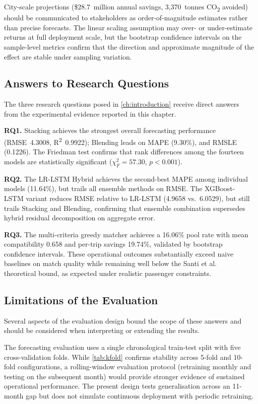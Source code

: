 City-scale projections (\$28.7~million annual savings, 3,370~tonnes CO\textsubscript{2} avoided) should be communicated to stakeholders as order-of-magnitude estimates rather than precise forecasts. The linear scaling assumption may over- or under-estimate returns at full deployment scale, but the bootstrap confidence intervals on the sample-level metrics confirm that the direction and approximate magnitude of the effect are stable under sampling variation.

\subsection{Answers to Research Questions}

The three research questions posed in \autoref{ch:introduction} receive direct answers from the experimental evidence reported in this chapter.

\textbf{RQ1.} Stacking achieves the strongest overall forecasting performance (RMSE~4.3008, R\textsuperscript{2}~0.9922); Blending leads on MAPE (9.30\%), and RMSLE (0.1226). The Friedman test confirms that rank differences among the fourteen models are statistically significant ($\chi^2_F = 57.30$, $p < 0.001$).

\textbf{RQ2.} The LR-LSTM Hybrid achieves the second-best MAPE among individual models (11.64\%), but trails all ensemble methods on RMSE. The XGBoost-LSTM variant reduces RMSE relative to LR-LSTM (4.9658 vs.\ 6.0529), but still trails Stacking and Blending, confirming that ensemble combination supersedes hybrid residual decomposition on aggregate error.

\textbf{RQ3.} The multi-criteria greedy matcher achieves a 16.06\% pool rate with mean compatibility 0.658 and per-trip savings 19.74\%, validated by bootstrap confidence intervals. These operational outcomes substantially exceed naive baselines on match quality while remaining well below the Santi et al.~\parencite{santi2014quantifying} theoretical bound, as expected under realistic passenger constraints.

\subsection{Limitations of the Evaluation}

Several aspects of the evaluation design bound the scope of these answers and should be considered when interpreting or extending the results.

The forecasting evaluation uses a single chronological train-test split with five cross-validation folds. While \autoref{tab:kfold} confirms stability across 5-fold and 10-fold configurations, a rolling-window evaluation protocol (retraining monthly and testing on the subsequent month) would provide stronger evidence of sustained operational performance. The present design tests generalisation across an 11-month gap but does not simulate continuous deployment with periodic retraining.

